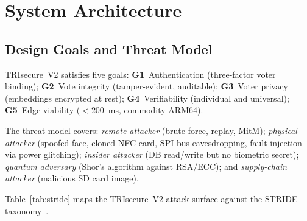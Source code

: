 \documentclass[submission]{sacjsub}
\begin{document}
\section{System Architecture}\label{sec:architecture}

\subsection{Design Goals and Threat Model}

TRIsecure~V2 satisfies five goals: \textbf{G1}~Authentication
(three-factor voter binding); \textbf{G2}~Vote integrity
(tamper-evident, auditable); \textbf{G3}~Voter privacy (embeddings
encrypted at rest); \textbf{G4}~Verifiability (individual and
universal); \textbf{G5}~Edge viability (\(<200\)~ms, commodity ARM64).

The threat model covers: \textit{remote attacker} (brute-force,
replay, MitM); \textit{physical attacker} (spoofed face, cloned NFC
card, SPI bus eavesdropping, fault injection via power glitching);
\textit{insider attacker} (DB read/write but no biometric secret);
\textit{quantum adversary} (Shor's algorithm against RSA/ECC); and
\textit{supply-chain attacker} (malicious SD card image).

Table~\ref{tab:stride} maps the TRIsecure~V2 attack surface against
the STRIDE taxonomy~\cite{shostack2014threat}.
\end{document}
